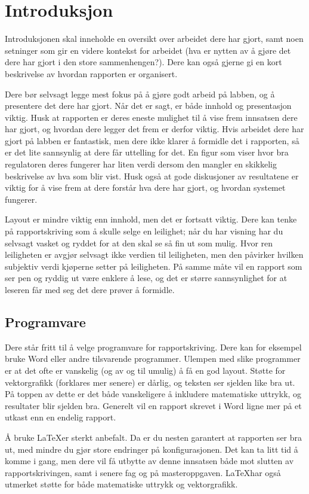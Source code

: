 \section{Introduksjon}\label{sec:intro}
Introduksjonen skal inneholde en oversikt over arbeidet dere har gjort, samt noen setninger som gir en videre kontekst for arbeidet (hva er nytten av å gjøre det dere har gjort i den store sammenhengen?). Dere kan også gjerne gi en kort beskrivelse av hvordan rapporten er organisert.

Dere bør selvsagt legge mest fokus på å gjøre godt arbeid på labben, og å
presentere det dere har gjort. Når det er sagt, er både innhold og
presentasjon viktig. Husk at rapporten er deres eneste mulighet til å vise
frem innsatsen dere har gjort, og hvordan dere legger det frem er derfor
viktig. Hvis arbeidet dere har gjort på labben er fantastisk, men dere ikke
klarer å formidle det i rapporten, så er det lite sannsynlig at dere får 
uttelling for det. En figur som viser hvor bra regulatoren deres fungerer
har liten verdi dersom den mangler en skikkelig beskrivelse av hva som blir
vist. Husk også at gode diskusjoner av resultatene er viktig for å vise frem
at dere forstår hva dere har gjort, og hvordan systemet fungerer.

Layout er mindre viktig enn innhold, men det er fortsatt viktig. Dere kan
tenke på rapportskriving som å skulle selge en leilighet; når du har 
visning har du selvsagt vasket og ryddet for at den skal se så fin ut som
mulig. Hvor ren leiligheten er avgjør selvsagt ikke verdien til leiligheten,
men den påvirker hvilken subjektiv verdi kjøperne setter på leiligheten.
På samme måte vil en rapport som ser pen og ryddig ut være enklere å lese, 
og det er større sannsynlighet for at leseren får med seg det dere prøver å
formidle.

\subsection{Programvare}
Dere står fritt til å velge programvare for rapportskriving.
Dere kan for eksempel bruke Word eller andre tilsvarende programmer. 
Ulempen med slike programmer er at det ofte er vanskelig (og av og til umulig)
å få en god layout. Støtte for vektorgrafikk (forklares mer senere) er dårlig,
og teksten ser sjelden like bra ut. På toppen av dette er det både vanskeligere
å inkludere matematiske uttrykk, og resultater blir sjelden bra. Generelt vil 
en rapport skrevet i Word ligne mer på et utkast enn en endelig rapport.

Å bruke \LaTeX er sterkt anbefalt. Da er du nesten garantert at rapporten ser 
bra ut, med mindre du gjør store endringer på konfigurasjonen. Det kan ta litt tid
å komme i gang, men dere vil få utbytte av denne innsatsen både mot slutten av 
rapportskrivingen, samt i senere fag og på masteroppgaven. \LaTeX har også 
utmerket støtte for både matematiske uttrykk og vektorgrafikk.
